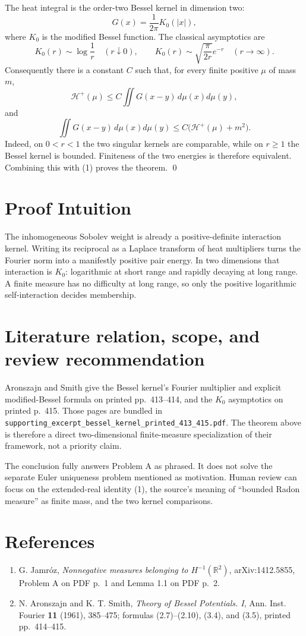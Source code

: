 \documentclass[11pt]{article}
\newcommand{\R}{\mathbb{R}}
\newcommand{\Hp}{\mathcal{H}^{+}}
\begin{document}
The heat integral is the order-two Bessel kernel in dimension two:
\[
 G(x)=\frac1{2\pi}K_0(|x|),
\]
where $K_0$ is the modified Bessel function.  The classical asymptotics are
\[
 K_0(r)\sim\log\frac1r\quad(r\downarrow0),
 \qquad
 K_0(r)\sim\sqrt{\frac{\pi}{2r}}e^{-r}\quad(r\to\infty).
\]
Consequently there is a constant $C$ such that, for every finite positive
$\mu$ of mass $m$,
\[
 \Hp(\mu)\le C\iint G(x-y)\,d\mu(x)d\mu(y),
\]
and
\[
 \iint G(x-y)\,d\mu(x)d\mu(y)
 \le C\bigl(\Hp(\mu)+m^2\bigr).
\]
Indeed, on $0<r<1$ the two singular kernels are comparable, while on
$r\ge1$ the Bessel kernel is bounded.  Finiteness of the two energies is
therefore equivalent.  Combining this with (1) proves the theorem. \qed

\section*{Proof Intuition}

The inhomogeneous Sobolev weight is already a positive-definite interaction
kernel.  Writing its reciprocal as a Laplace transform of heat multipliers
turns the Fourier norm into a manifestly positive pair energy.  In two
dimensions that interaction is $K_0$: logarithmic at short range and rapidly
decaying at long range.  A finite measure has no difficulty at long range, so
only the positive logarithmic self-interaction decides membership.

\section*{Literature relation, scope, and review recommendation}

Aronszajn and Smith give the Bessel kernel's Fourier multiplier and explicit
modified-Bessel formula on printed pp.~413--414, and the $K_0$ asymptotics on
printed p.~415.  Those pages are bundled in
\texttt{supporting\_excerpt\_bessel\_kernel\_printed\_413\_415.pdf}.
The theorem above is therefore a direct two-dimensional finite-measure
specialization of their framework, not a priority claim.

The conclusion fully answers Problem A as phrased.  It does not solve the
separate Euler uniqueness problem mentioned as motivation.  Human review can
focus on the extended-real identity (1), the source's meaning of ``bounded
Radon measure'' as finite mass, and the two kernel comparisons.

\section*{References}

\begin{enumerate}
\item G. Jamr\'oz, \emph{Nonnegative measures belonging to
  $H^{-1}(\R^2)$}, arXiv:1412.5855, Problem A on PDF p.~1 and Lemma 1.1 on
  PDF p.~2.
\item N. Aronszajn and K. T. Smith, \emph{Theory of Bessel Potentials. I},
  Ann. Inst. Fourier \textbf{11} (1961), 385--475; formulas (2.7)--(2.10),
  (3.4), and (3.5), printed pp.~414--415.
\end{enumerate}
\end{document}
